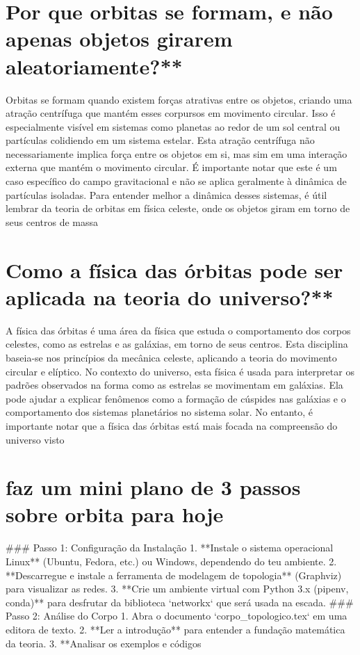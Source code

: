 \documentclass[11pt,a4paper]{article}
\begin{document}
\section{Por que orbitas se formam, e não apenas objetos girarem aleatoriamente?**}
Orbitas se formam quando existem forças atrativas entre os objetos, criando uma atração centrífuga que mantém esses corpursos em movimento circular. Isso é especialmente visível em sistemas como planetas ao redor de um sol central ou partículas colidiendo em um sistema estelar. Esta atração centrífuga não necessariamente implica força entre os objetos em si, mas sim em uma interação externa que mantém o movimento circular. É importante notar que este é um caso específico do campo gravitacional e não se aplica geralmente à dinâmica de partículas isoladas. Para entender melhor a dinâmica desses sistemas, é útil lembrar da teoria de orbitas em física celeste, onde os objetos giram em torno de seus centros de massa

\section{Como a física das órbitas pode ser aplicada na teoria do universo?**}
A física das órbitas é uma área da física que estuda o comportamento dos corpos celestes, como as estrelas e as galáxias, em torno de seus centros. Esta disciplina baseia-se nos princípios da mecânica celeste, aplicando a teoria do movimento circular e elíptico. No contexto do universo, esta física é usada para interpretar os padrões observados na forma como as estrelas se movimentam em galáxias. Ela pode ajudar a explicar fenômenos como a formação de cúspides nas galáxias e o comportamento dos sistemas planetários no sistema solar. No entanto, é importante notar que a física das órbitas está mais focada na compreensão do universo visto

\section{faz um mini plano de 3 passos sobre orbita para hoje}
\#\#\# Passo 1: Configuração da Instalação 1. **Instale o sistema operacional Linux** (Ubuntu, Fedora, etc.) ou Windows, dependendo do teu ambiente. 2. **Descarregue e instale a ferramenta de modelagem de topologia** (Graphviz) para visualizar as redes. 3. **Crie um ambiente virtual com Python 3.x (pipenv, conda)** para desfrutar da biblioteca `networkx` que será usada na escada. \#\#\# Passo 2: Análise do Corpo 1. Abra o documento `corpo\_topologico.tex` em uma editora de texto. 2. **Ler a introdução** para entender a fundação matemática da teoria. 3. **Analisar os exemplos e códigos
\end{document}
